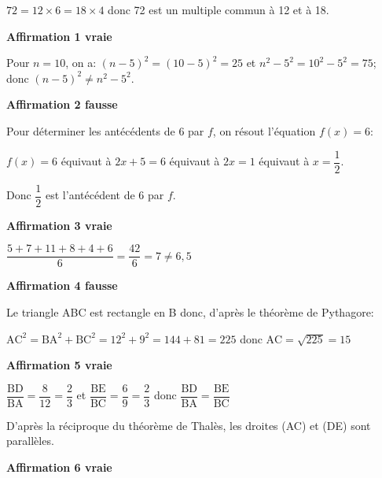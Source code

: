 \begin{list}{\textbullet}{}
\item $72=12\times 6 = 18 \times 4$ donc 72 est un multiple commun à 12 et à 18.

\hfill\textbf{Affirmation 1 vraie}
\item Pour $n=10$, on a: $(n-5)^2=(10-5)^2=25$ et $n^2-5^2=10^2-5^2=75$; donc $(n-5)^2 \neq n^2-5^2$.

\hfill\textbf{Affirmation 2 fausse}

\item Pour déterminer les antécédents de 6 par $f$, on résout l'équation $f(x)=6$:

$f(x)=6$ équivaut à $2x+5=6$ équivaut à $2x=1$ équivaut à $x=\dfrac{1}{2}$. 

Donc $\dfrac{1}{2}$ est l'antécédent de 6 par $f$.

\hfill\textbf{Affirmation 3 vraie}

\item $\dfrac{5+7+11+8+4+6}{6}=\dfrac{42}{6}=7 \neq 6,5$

\hfill\textbf{Affirmation 4 fausse}

\item Le triangle ABC est rectangle en B donc, d'après le théorème de Pythagore:

$\text{AC}^2 = \text{BA}^2 + \text{BC}^2 = 12^2+9^2=144+81=225$ donc $\text{AC}=\sqrt{225}=15$

\hfill\textbf{Affirmation 5 vraie}

\item $\dfrac{\text{BD}}{\text{BA}}=\dfrac{8}{12}=\dfrac{2}{3}$ et $\dfrac{\text{BE}}{\text{BC}}=\dfrac{6}{9}=\dfrac{2}{3}$
donc $\dfrac{\text{BD}}{\text{BA}}=\dfrac{\text{BE}}{\text{BC}}$ 

\smallskip

D'après la réciproque du théorème de Thalès, les droites (AC) et (DE) sont parallèles.

\hfill\textbf{Affirmation 6 vraie}
\end{list}


